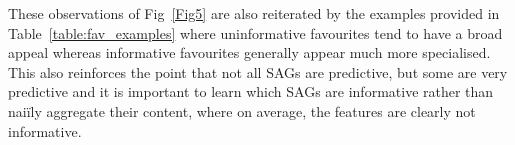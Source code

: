    These observations of Fig~\ref{Fig5} are also reiterated by the
    examples provided in Table~\ref{table:fav_examples} where uninformative favourites
    tend to have a broad appeal whereas informative favourites generally appear much
    more specialised.  This also reinforces the point that not all SAGs are predictive,
    but some are very predictive and it is important to learn which SAGs are informative
    rather than nai\"{i}ly aggregate their content, where on average, the features are
    clearly not informative.

%


